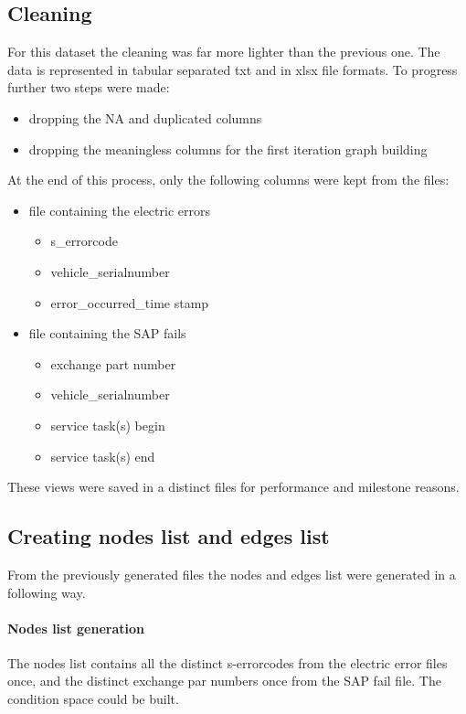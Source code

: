 	\subsection{Cleaning}
For this dataset the cleaning was far more lighter than the previous one. The data is represented in tabular separated txt and in xlsx file formats.
To progress further two steps were made:
\begin{itemize}
			\item{dropping the NA and duplicated columns}
			\item{dropping the meaningless columns for the first iteration graph building}
\end{itemize}

At the end of this process, only the following columns were kept from the files:
\begin{itemize}
			\item{file containing the electric errors}
			\begin{itemize}
				\item{s\_errorcode}
				\item{vehicle\_serialnumber}
				\item{error\_occurred\_time stamp}
			\end{itemize}
			\item{file containing the SAP fails}
			\begin{itemize}
				\item{exchange part number}
				\item{vehicle\_serialnumber}
				\item{service task(s) begin}
				\item{service task(s) end}
			\end{itemize}
\end{itemize}
These views were saved in a distinct files for performance and milestone reasons.
	\subsection{Creating nodes list and edges list}
From the previously generated files the nodes and edges list were generated in a following way.
\paragraph{Nodes list generation}
The nodes list contains all the distinct s-errorcodes from the electric error files once, and the distinct exchange par numbers once from the SAP fail file. The condition space could be built.

